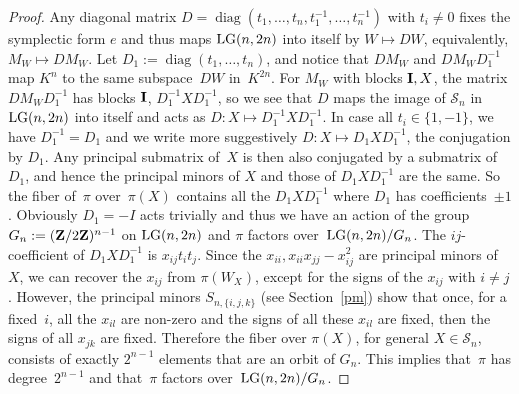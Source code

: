 \documentclass[10pt,a4paper]{amsart}
\newcommand{\ZZ}{{\bf Z}}
\newcommand{\cS}{{\cal S}}
\numberwithin{equation}{section}
\providecommand{\cal}{\mathcal}
\begin{document}
\begin{proof} Any diagonal matrix $D=\operatorname{diag}(t_1,\ldots,t_n,t_1^{-1},\ldots,t_n^{-1})$ with $t_i\ne 0$ fixes the symplectic form $e$ and thus maps ${\rm LG}(n,2n)$ into itself by $W\mapsto DW$, equivalently, $M_W\mapsto DM_W$. Let $D_1:=\operatorname{diag}(t_1,\ldots,t_n)$, and notice that $DM_W$ and $DM_WD_1^{-1}$ map $K^n$ to the same subspace~$DW$ in~$K^{2n}$. For $M_W$ with blocks ${\bf I},X$, the matrix $DM_WD_1^{-1}$ has blocks ${\bf I}$, $D_1^{-1}XD_1^{-1}$, so we see that $D$ maps the image of $\cS_n$ in ${\rm LG}(n,2n)$ into itself and acts as $D\colon X\mapsto D_1^{-1}XD_1^{-1}$. In case all $t_i\in\{1,-1\}$, we have $D_1^{-1}=D_1$ and we write more suggestively $D\colon X\mapsto D_1XD_1^{-1}$, the conjugation by $D_1$. Any principal submatrix of~$X$ is then also conjugated by a submatrix of~$D_1$, and hence the principal minors of $X$ and those of $D_1XD_1^{-1}$ are the same. So the fiber of~$\pi$ over~$\pi(X)$ contains all the $D_1XD_1^{-1}$ where $D_1$ has coefficients~$\pm 1$. Obviously $D_1=-I$ acts trivially and thus we have an action of the group $G_n:=(\ZZ/2\ZZ)^{n-1}$ on ${\rm LG}(n,2n)$ and $\pi$ factors over~${\rm LG}(n,2n)/G_n$. The $ij$-coefficient of $D_1XD_1^{-1}$ is $x_{ij}t_it_j$. Since the $x_{ii},x_{ii}x_{jj}-x_{ij}^2$ are principal minors of $X$, we can recover the $x_{ij}$ from $\pi(W_X)$, except for the signs of the $x_{ij}$ with $i\ne j$. However, the principal minors $S_{n,\{i,j,k\}}$ (see Section~\ref{pm}) show that once, for a fixed~$i$, all the $x_{il}$ are non-zero and the signs of all these $x_{il}$ are fixed, then the signs of all $x_{jk}$ are fixed. Therefore the fiber over $\pi(X)$, for general $X\in \cS_n$, consists of exactly $2^{n-1}$ elements that are an orbit of $G_n$. This implies that~$\pi$ has degree~$2^{n-1}$ and that~$\pi$ factors over~${\rm LG}(n,2n)/G_n$.
\end{proof}
\end{document}
